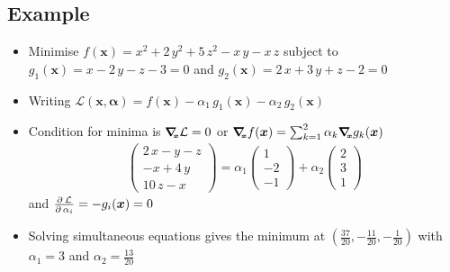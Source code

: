 
\begin{slide}
\section[-2]{Example}

\begin{PauseHighLight}
  \begin{itemize}
  \item Minimise $f(\bm{x}) = x^2 + 2\,y^2 + 5\,z^2- x\,y -x\,z$ subject
  to $g_1(\bm{x}) = x - 2\,y -z -3 = 0$ and $g_2(\bm{x}) = 
  2\,x + 3\,y +z - 2 = 0$ \pause
  \item Writing $\mathcal{L}(\bm{x},\bm{\alpha}) = f(\bm{x}) - \alpha_1\,g_1(\bm{x}) 
    - \alpha_2\,g_2(\bm{x})$\pause
  \item Condition for minima is $\bm{\nabla}_{\!\!\scriptscriptstyle \bm{x}} \mathcal{L} = 0$ or $\bm{\nabla}_{\!\!\scriptscriptstyle \bm{x}}
  f(\bm{x}) = \sum_{k=1}^2 \alpha_k \bm{\nabla}_{\!\!\scriptscriptstyle \bm{x}} g_k(\bm{x})$
    \begin{align*}
      \begin{pmatrix}
        2\,x -y -z\\ -x + 4\,y \\ 10\,z -x
      \end{pmatrix}
      = \alpha_1 
      \begin{pmatrix}
        1 \\ -2 \\ -1
      \end{pmatrix}
      + \alpha_2
      \begin{pmatrix}
        2 \\ 3 \\ 1
      \end{pmatrix}
    \end{align*}
    and $\frac{\partial^{\,}{\mathcal{L}}}{\partial\,{\alpha_i}} = -g_i(\bm{x}) = 0$\pause
  \item Solving simultaneous equations gives the minimum at $(\frac{37}{20}, -
  \frac{11}{20}, -\frac{1}{20})$ with $\alpha_1=3$ and
  $\alpha_2=\frac{13}{20}$\pause
  \end{itemize}
\end{PauseHighLight}

\end{slide}

\Outline %

